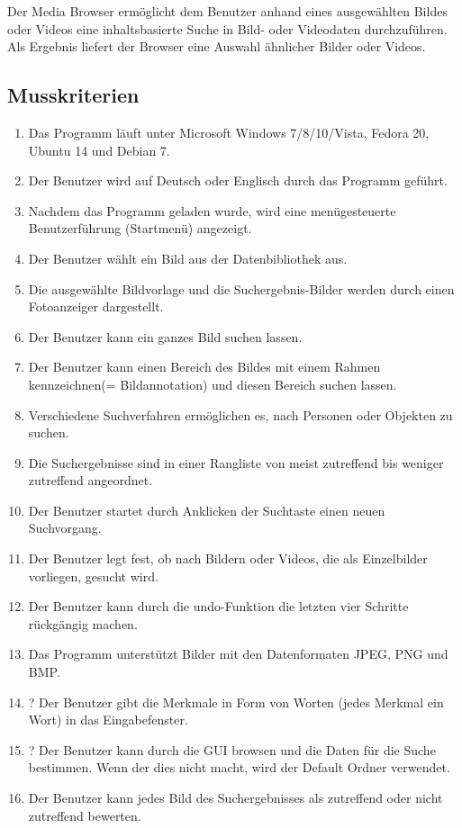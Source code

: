 Der Media Browser ermöglicht dem Benutzer anhand eines ausgewählten Bildes oder Videos eine inhaltsbasierte Suche in Bild- oder Videodaten durchzuführen. Als Ergebnis liefert der Browser eine Auswahl ähnlicher Bilder oder Videos.
\subsection{Musskriterien}
\begin{enumerate} [label=\bfseries /MK \arabic*0/]
\item Das Programm läuft unter Microsoft Windows 7/8/10/Vista, Fedora 20, Ubuntu 14 und Debian 7.
\item Der Benutzer wird auf Deutsch oder Englisch durch das Programm geführt.
\item Nachdem das Programm geladen wurde, wird eine menügesteuerte Benutzerführung (Startmenü) angezeigt.
\item Der Benutzer wählt ein Bild aus der Datenbibliothek aus.
\item Die ausgewählte Bildvorlage und die Suchergebnis-Bilder werden durch einen Fotoanzeiger dargestellt.
\item Der Benutzer kann ein ganzes Bild suchen lassen.
\item Der Benutzer kann einen Bereich des Bildes mit einem Rahmen kennzeichnen(= Bildannotation) und diesen Bereich suchen lassen.
\item Verschiedene Suchverfahren ermöglichen es, nach Personen oder Objekten zu suchen.
\item Die Suchergebnisse sind in einer Rangliste von meist zutreffend bis weniger zutreffend angeordnet.
\item Der Benutzer startet durch Anklicken der Suchtaste einen neuen Suchvorgang.
\item Der Benutzer legt fest, ob nach Bildern oder Videos, die als Einzelbilder vorliegen, gesucht wird.
\item Der Benutzer kann durch die undo-Funktion die letzten vier Schritte rückgängig machen.
\item Das Programm unterstützt Bilder mit den Datenformaten JPEG, PNG und BMP.
\item ? Der Benutzer gibt die Merkmale in Form von Worten (jedes Merkmal ein Wort) in das Eingabefenster.
\item ? Der Benutzer kann durch die GUI browsen und die Daten für die Suche bestimmen. Wenn der dies nicht macht, wird der Default Ordner verwendet.
\item Der Benutzer kann jedes Bild des Suchergebnisses als zutreffend oder nicht zutreffend bewerten.

\end{enumerate}
